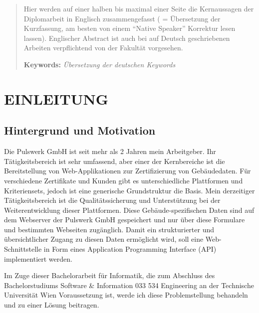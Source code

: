 \documentclass[draft,final]{vutinfth} %
\begin{document}
\begin{abstract}
Hier werden auf einer halben bis maximal einer Seite die Kernaussagen der Diplomarbeit in Englisch zusammengefasst ( = Übersetzung der Kurzfassung, am besten von einem \enquote{Native Speaker} Korrektur lesen lassen). Englischer Abstract ist auch bei auf Deutsch geschriebenen Arbeiten verpflichtend von der Fakultät vorgesehen.


\textbf{Keywords:} \emph{Übersetzung der deutschen Keywords}
\end{abstract}


\tableofcontents %

\mainmatter


\chapter{EINLEITUNG}

\section{Hintergrund und Motivation}

Die Pulswerk GmbH ist seit mehr als 2 Jahren mein Arbeitgeber.
Ihr Tätigkeitsbereich ist sehr umfassend, aber einer der Kernbereiche ist die Bereitstellung von Web-Applikationen zur Zertifizierung von Gebäudedaten.
Für verschiedene Zertifikate und Kunden gibt es unterschiedliche Plattformen und Kriteriensets, jedoch ist eine generische Grundstruktur die Basis. 
Mein derzeitiger Tätigkeitsbereich ist die Qualitätssicherung und Unterstützung bei der Weiterentwicklung dieser Plattformen.
Diese Gebäude-spezifischen Daten sind auf dem Webserver der Pulswerk GmbH gespeichert und nur über diese Formulare und bestimmten Webseiten zugänglich.
Damit ein strukturierter und übersichtlicher Zugang zu diesen Daten ermöglicht wird, soll eine Web-Schnittstelle in Form eines Application Programming Interface (API) implementiert werden.

Im Zuge dieser Bachelorarbeit für Informatik, die zum Abschluss des Bachelorstudiums Software \& Information 033 534 Engineering an der Technische Universität Wien Voraussetzung ist, werde ich diese Problemstellung behandeln und zu einer Lösung beitragen.
 
\end{document}
